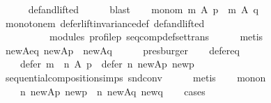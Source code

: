 \begin{isabellebody}
\ \ \ \ \isamarkupfalse%
\ def{\isacharunderscore}{\kern0pt}and{\isacharunderscore}{\kern0pt}lifted\isanewline
\ \ \ \ \isamarkupfalse%
\ blast\isanewline
\ \ \isamarkupfalse%
\ mono{\isacharunderscore}{\kern0pt}m{\isacharcolon}{\kern0pt}\ {\isachardoublequoteopen}m\ A\ p\ {\isacharequal}{\kern0pt}\ m\ A\ q{\isachardoublequoteclose}\isanewline
\ \ \ \ \isamarkupfalse%
\ monotone{\isacharunderscore}{\kern0pt}m\ defer{\isacharunderscore}{\kern0pt}lift{\isacharunderscore}{\kern0pt}invariance{\isacharunderscore}{\kern0pt}def\ def{\isacharunderscore}{\kern0pt}and{\isacharunderscore}{\kern0pt}lifted\isanewline
\ \ \ \ \ \ \ \ \ \ modules\ profile{\isacharunderscore}{\kern0pt}p\ seq{\isacharunderscore}{\kern0pt}comp{\isacharunderscore}{\kern0pt}def{\isacharunderscore}{\kern0pt}set{\isacharunderscore}{\kern0pt}trans\isanewline
\ \ \ \ \isamarkupfalse%
\ metis\isanewline
\ \ \isamarkupfalse%
\ new{\isacharunderscore}{\kern0pt}A{\isacharunderscore}{\kern0pt}eq{\isacharcolon}{\kern0pt}\ {\isachardoublequoteopen}{\isacharquery}{\kern0pt}new{\isacharunderscore}{\kern0pt}Ap\ {\isacharequal}{\kern0pt}\ {\isacharquery}{\kern0pt}new{\isacharunderscore}{\kern0pt}Aq{\isachardoublequoteclose}\isanewline
\ \ \ \ \isamarkupfalse%
\ presburger\isanewline
\ \ \isamarkupfalse%
\ defer{\isacharunderscore}{\kern0pt}eq{\isacharcolon}{\kern0pt}\isanewline
\ \ \ \ {\isachardoublequoteopen}defer\ {\isacharparenleft}{\kern0pt}m\ {\isasymtriangleright}\ n{\isacharparenright}{\kern0pt}\ A\ p\ {\isacharequal}{\kern0pt}\ defer\ n\ {\isacharquery}{\kern0pt}new{\isacharunderscore}{\kern0pt}Ap\ {\isacharquery}{\kern0pt}new{\isacharunderscore}{\kern0pt}p{\isachardoublequoteclose}\isanewline
\ \ \ \ \isamarkupfalse%
\ sequential{\isacharunderscore}{\kern0pt}composition{\isachardot}{\kern0pt}simps\ snd{\isacharunderscore}{\kern0pt}conv\isanewline
\ \ \ \ \isamarkupfalse%
\ metis\isanewline
\ \ \isamarkupfalse%
\ mono{\isacharunderscore}{\kern0pt}n{\isacharcolon}{\kern0pt}\isanewline
\ \ \ \ {\isachardoublequoteopen}n\ {\isacharquery}{\kern0pt}new{\isacharunderscore}{\kern0pt}Ap\ {\isacharquery}{\kern0pt}new{\isacharunderscore}{\kern0pt}p\ {\isacharequal}{\kern0pt}\ n\ {\isacharquery}{\kern0pt}new{\isacharunderscore}{\kern0pt}Aq\ {\isacharquery}{\kern0pt}new{\isacharunderscore}{\kern0pt}q{\isachardoublequoteclose}\isanewline
\ \ \isamarkupfalse%
\ cases\isanewline
\ \ \ \ \isamarkupfalse%

\end{isabellebody}
